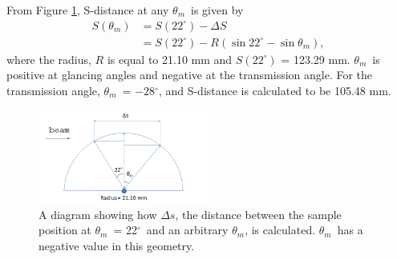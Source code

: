 \documentclass[letterpaper,12pt]{article}
\newcommand{\dg}{$^{\circ}$}%
\newcommand{\motor}{$\theta_m$}%
\begin{document}
From Figure \ref{fig:sgeometry}, S-distance at any \motor\ is given by
\begin{align}
	S(\theta_m) &= S(22^{\circ}) - \Delta S \nonumber\\
							&= S(22^{\circ}) - R(\sin 22^{\circ} - \sin\theta_m),
\end{align}
where the radius, $R$ is equal to 21.10 mm and $S(22^{\circ})$ = 123.29 mm. \motor\ is positive at glancing angles and negative at the transmission angle. For the transmission angle, \motor\ = $-28$\dg, and S-distance is calculated to be 105.48 mm.
\begin{figure}[htbp]
	\centering
	\includegraphics[width=0.5\textwidth]{sgeometry}
	\caption[A diagram showing how $\Delta s$, the distance between the sample position at \motor\ = 22\dg\ and an arbitrary \motor, is calculated]{A diagram showing how $\Delta s$, the distance between the sample position at \motor\ = 22\dg\ and an arbitrary \motor, is calculated. \motor\ has a negative value in this geometry.}
	\label{fig:sgeometry}
\end{figure}
\end{document}
